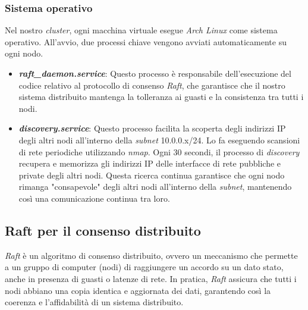 \subsubsection{Sistema operativo}
Nel nostro \textit{cluster}, ogni macchina virtuale esegue \textit{Arch Linux} come sistema operativo. All'avvio, due processi chiave vengono avviati automaticamente su ogni nodo.
\begin{itemize}
  \item \textit{\textbf{raft\_daemon.service}}: Questo processo è responsabile dell'esecuzione del codice relativo al protocollo di consenso \textit{Raft}, che garantisce che il nostro sistema distribuito mantenga la tolleranza 
    ai guasti e la consistenza tra tutti i nodi.
  \item \textit{\textbf{discovery.service}}: Questo processo facilita la scoperta degli indirizzi IP degli altri nodi all'interno della \textit{subnet} 10.0.0.x/24. Lo fa eseguendo scansioni di rete periodiche utilizzando 
    \textit{nmap}. Ogni 30 secondi, il processo di \textit{discovery} recupera e memorizza gli indirizzi IP delle interfacce di rete pubbliche e private degli altri nodi. Questa ricerca continua garantisce che ogni nodo 
    rimanga "consapevole" degli altri nodi all'interno della \textit{subnet}, mantenendo così una comunicazione continua tra loro.
\end{itemize}



\subsection{Raft per il consenso distribuito}
\textit{Raft} è un algoritmo di consenso distribuito, ovvero un meccanismo che permette a un gruppo di computer (nodi) di raggiungere un accordo su un dato stato, anche in presenza di guasti o latenze di rete. In pratica, 
\textit{Raft} assicura che tutti i nodi abbiano una copia identica e aggiornata dei dati, garantendo così la coerenza e l'affidabilità di un sistema distribuito.

